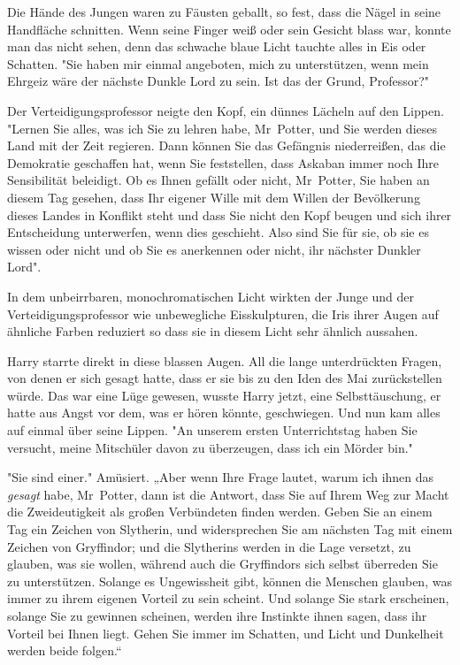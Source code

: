 {Die Hände des Jungen waren zu Fäusten geballt, so fest, dass die Nägel in seine Handfläche schnitten. Wenn seine Finger weiß oder sein Gesicht blass war, konnte man das nicht sehen, denn das schwache blaue Licht tauchte alles in Eis oder Schatten. "Sie haben mir einmal angeboten, mich zu unterstützen, wenn mein Ehrgeiz wäre der nächste Dunkle Lord zu sein. Ist das der Grund, Professor?"

Der Verteidigungsprofessor neigte den Kopf, ein dünnes Lächeln auf den Lippen. "Lernen Sie alles, was ich Sie zu lehren habe, Mr~Potter, und Sie werden dieses Land mit der Zeit regieren. Dann können Sie das Gefängnis niederreißen, das die Demokratie geschaffen hat, wenn Sie feststellen, dass Askaban immer noch Ihre Sensibilität beleidigt. Ob es Ihnen gefällt oder nicht, Mr~Potter, Sie haben an diesem Tag gesehen, dass Ihr eigener Wille mit dem Willen der Bevölkerung dieses Landes in Konflikt steht und dass Sie nicht den Kopf beugen und sich ihrer Entscheidung unterwerfen, wenn dies geschieht. Also sind Sie für sie, ob sie es wissen oder nicht und ob Sie es anerkennen oder nicht, ihr nächster Dunkler Lord".

In dem unbeirrbaren, monochromatischen Licht wirkten der Junge und der Verteidigungsprofessor wie unbewegliche Eisskulpturen, die Iris ihrer Augen auf ähnliche Farben reduziert so dass sie in diesem Licht sehr ähnlich aussahen.

Harry starrte direkt in diese blassen Augen. All die lange unterdrückten Fragen, von denen er sich gesagt hatte, dass er sie bis zu den Iden des Mai zurückstellen würde. Das war eine Lüge gewesen, wusste Harry jetzt, eine Selbsttäuschung, er hatte aus Angst vor dem, was er hören könnte, geschwiegen. Und nun kam alles auf einmal über seine Lippen. "An unserem ersten Unterrichtstag haben Sie versucht, meine Mitschüler davon zu überzeugen, dass ich ein Mörder bin."

"Sie sind einer." Amüsiert. „Aber wenn Ihre Frage lautet, warum ich ihnen das \emph{gesagt} habe, Mr~Potter, dann ist die Antwort, dass Sie auf Ihrem Weg zur Macht die Zweideutigkeit als großen Verbündeten finden werden. Geben Sie an einem Tag ein Zeichen von Slytherin, und widersprechen Sie am nächsten Tag mit einem Zeichen von Gryffindor; und die Slytherins werden in die Lage versetzt, zu glauben, was sie wollen, während auch die Gryffindors sich selbst überreden Sie zu unterstützen. Solange es Ungewissheit gibt, können die Menschen glauben, was immer zu ihrem eigenen Vorteil zu sein scheint. Und solange Sie stark erscheinen, solange Sie zu gewinnen scheinen, werden ihre Instinkte ihnen sagen, dass ihr Vorteil bei Ihnen liegt. Gehen Sie immer im Schatten, und Licht und Dunkelheit werden beide folgen.“

}
